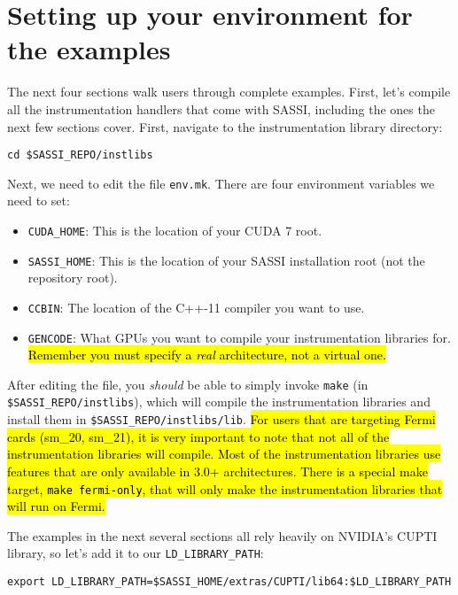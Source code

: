 \section{Setting up your environment for the examples}
\label{sec:environment}

The next four sections walk users through complete examples.  First,
let's compile all the instrumentation handlers that come with SASSI,
including the ones the next few sections cover.  First, navigate to
the instrumentation library directory:
\begin{lstlisting}[style=BashInputStyle]
cd $SASSI_REPO/instlibs
\end{lstlisting}
Next, we need to edit the file \texttt{env.mk}.  There are four
environment variables we need to set:
\begin{itemize}
\item \texttt{CUDA\_HOME}: This is the location of your CUDA 7 root.
\item \texttt{SASSI\_HOME}: This is the location of your SASSI
  installation root (not the repository root).
\item \texttt{CCBIN}: The location of the C++-11 compiler you want to
  use. 
\item \texttt{GENCODE}: What GPUs you want to compile your
  instrumentation libraries for. \hl{Remember you must specify a
    \emph{real} architecture, not a virtual one.}
\end{itemize}

After editing the file, you \emph{should} be able to simply invoke
\texttt{make} (in \texttt{\$SASSI\_REPO/instlibs}), which will compile
the instrumentation libraries and install them in
\texttt{\$SASSI\_REPO/instlibs/lib}. \hl{For users that are targeting
  Fermi cards (sm\_20, sm\_21), it is very important to note that not
  all of the instrumentation libraries will compile.  Most of the
  instrumentation libraries use features that are only available in
  3.0+ architectures.  There is a special make target, \texttt{make
    fermi-only}, that will only make the instrumentation libraries
  that will run on Fermi.}

The examples in the next several sections all rely heavily on NVIDIA's
CUPTI library, so let's add it to our \texttt{LD\_LIBRARY\_PATH}:
\begin{lstlisting}[style=BashInputStyle]
export LD_LIBRARY_PATH=$SASSI_HOME/extras/CUPTI/lib64:$LD_LIBRARY_PATH
\end{lstlisting}

